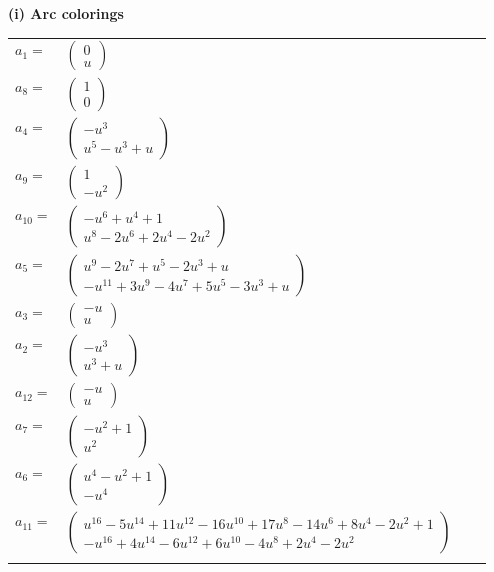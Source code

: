 \documentclass[1p]{elsarticle_modified}
\theoremstyle{definition}
\begin{document}
\flushleft \textbf{(i) Arc colorings}\\
\begin{tabular}{m{7pt} m{180pt} m{7pt} m{180pt} }
\flushright $a_{1}=$&$\begin{pmatrix}0\\u\end{pmatrix}$ \\
\flushright $a_{8}=$&$\begin{pmatrix}1\\0\end{pmatrix}$ \\
\flushright $a_{4}=$&$\begin{pmatrix}- u^3\\u^5- u^3+u\end{pmatrix}$ \\
\flushright $a_{9}=$&$\begin{pmatrix}1\\- u^2\end{pmatrix}$ \\
\flushright $a_{10}=$&$\begin{pmatrix}- u^6+u^4+1\\u^8-2 u^6+2 u^4-2 u^2\end{pmatrix}$ \\
\flushright $a_{5}=$&$\begin{pmatrix}u^9-2 u^7+u^5-2 u^3+u\\- u^{11}+3 u^9-4 u^7+5 u^5-3 u^3+u\end{pmatrix}$ \\
\flushright $a_{3}=$&$\begin{pmatrix}- u\\u\end{pmatrix}$ \\
\flushright $a_{2}=$&$\begin{pmatrix}- u^3\\u^3+u\end{pmatrix}$ \\
\flushright $a_{12}=$&$\begin{pmatrix}- u\\u\end{pmatrix}$ \\
\flushright $a_{7}=$&$\begin{pmatrix}- u^2+1\\u^2\end{pmatrix}$ \\
\flushright $a_{6}=$&$\begin{pmatrix}u^4- u^2+1\\- u^4\end{pmatrix}$ \\
\flushright $a_{11}=$&$\begin{pmatrix}u^{16}-5 u^{14}+11 u^{12}-16 u^{10}+17 u^8-14 u^6+8 u^4-2 u^2+1\\- u^{16}+4 u^{14}-6 u^{12}+6 u^{10}-4 u^8+2 u^4-2 u^2\end{pmatrix}$\\&\end{tabular}
\end{document}
